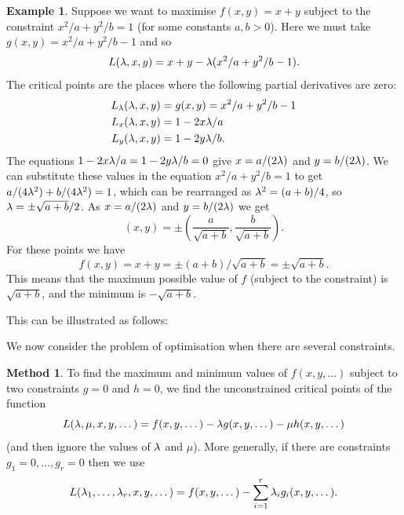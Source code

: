 \documentclass[reqno]{amsart}
\theoremstyle{definition}
\newtheorem{example}[theorem]{Example}
\newtheorem{method}[theorem]{Method}
\begin{document}
\begin{example}
 Suppose we want to maximise $f(x,y)=x+y$ subject to the constraint
 $x^2/a+y^2/b=1$ (for some constants $a,b>0$).  Here we must take
 $g(x,y)=x^2/a+y^2/b-1$ and so
 \[ L(\lambda,x,y) = x+y-\lambda(x^2/a+y^2/b-1). \]
 The critical points are the places where the following partial
 derivatives are zero:
 \begin{align*}
  L_\lambda(\lambda,x,y) &= g(x,y) = x^2/a+y^2/b-1 \\
  L_x(\lambda,x,y) &= 1-2x\lambda/a \\
  L_y(\lambda,x,y) &= 1-2y\lambda/b.
 \end{align*}
 The equations $1-2x\lambda/a=1-2y\lambda/b=0$ give $x=a/(2\lambda)$ and
 $y=b/(2\lambda)$.  We can substitute these values in the equation
 $x^2/a+y^2/b=1$ to get $a/(4\lambda^2)+b/(4\lambda^2)=1$, which can be
 rearranged as $\lambda^2=(a+b)/4$, so
 $\lambda=\pm\sqrt{a+b}/2$.  As $x=a/(2\lambda)$ and $y=b/(2\lambda)$ we get 
 \[ (x,y) =
     \pm \left(\frac{a}{\sqrt{a+b}},\frac{b}{\sqrt{a+b}}\right).
 \]
 For these points we have 
 \[ f(x,y)=x+y=\pm(a+b)/\sqrt{a+b} = \pm\sqrt{a+b}. \]
 This means that the maximum possible value of $f$ (subject to the
 constraint) is $\sqrt{a+b}$, and the minimum is $-\sqrt{a+b}$.

 This can be illustrated as follows:
 \begin{center}
 \end{center}
\end{example}

We now consider the problem of optimisation when there are several
constraints. 
\begin{method}\label{meth-lagrange-multi}
 To find the maximum and minimum values of $f(x,y,\dotsc)$ subject to
 two constraints $g=0$ and $h=0$, we find the unconstrained critical
 points of the function 
 \[ L(\lambda,\mu,x,y,\dotsc) =
     f(x,y,\dotsc) - \lambda g(x,y,\dotsc) - \mu h(x,y,\dotsc)
 \]
 (and then ignore the values of $\lambda$ and $\mu$).  More generally, if
 there are constraints $g_1=0,\dotsc,g_r=0$ then we use
 \[ L(\lambda_1,\dots,\lambda_r,x,y,\dotsc) =
      f(x,y,\dotsc) - \sum_{i=1}^r \lambda_i g_i(x,y,\dotsc).
 \]
\end{method}
\end{document}
